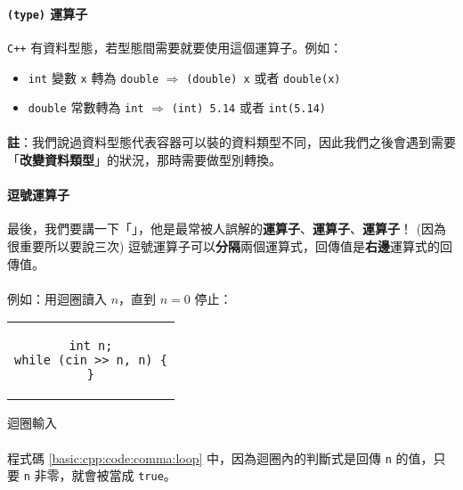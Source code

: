 \documentclass[12pt,a4paper,oneside]{article}
\begin{document}
\begin{CJK}{UTF8}{bkai}
\paragraph{\lstinline!(type)! 運算子}\texttt{C++} 有資料型態，若型態間需要就要使用這個運算子。例如：

\begin{itemize}
\item \lstinline!int! 變數 \lstinline!x! 轉為 \lstinline!double! $\Rightarrow$ \lstinline!(double) x! 或者 \lstinline!double(x)!
\item \lstinline!double! 常數轉為 \lstinline!int! 
$\Rightarrow$ \lstinline!(int) 5.14! 或者 \lstinline!int(5.14)!
\end{itemize}

\paragraph{}\textbf{註}：我們說過資料型態代表容器可以裝的資料類型不同，因此我們之後會遇到需要「\textbf{改變資料類型}」的狀況，那時需要做型別轉換。

\paragraph{逗號運算子}最後，我們要講一下「」，他是最常被人誤解的\textbf{運算子}、\textbf{運算子}、\textbf{運算子}！ (因為很重要所以要說三次) 逗號運算子可以\textbf{分隔}兩個運算式，回傳值是\textbf{右邊}運算式的回傳值。

\paragraph{}例如：用迴圈讀入 $n$，直到 $n=0$ 停止：

\begin{code}[h!]
\centering
\begin{tabular}{c}
\begin{lstlisting}
int n;
while (cin >> n, n) {
}
\end{lstlisting}
\end{tabular}
\caption{迴圈輸入}
\label{basic:cpp:code:comma:loop}
\end{code}

\paragraph{}程式碼 \ref{basic:cpp:code:comma:loop} 中，因為迴圈內的判斷式是回傳 \lstinline!n! 的值，只要 \lstinline!n! 非零，就會被當成 \lstinline!true!。


\end{CJK}
\end{document}
